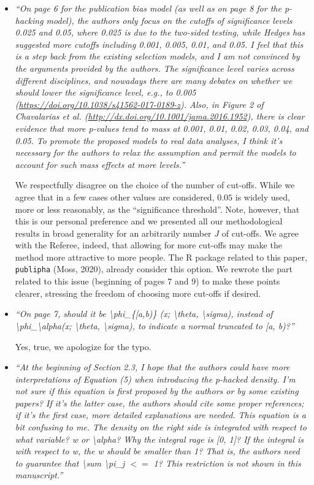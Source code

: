 \documentclass[11pt]{article}
\begin{document}
\begin{itemize}
\item \emph{``On page 6 for the publication bias model (as well as on page 8 for the p-hacking model), the authors only focus on the cutoffs of significance levels 0.025 and 0.05, where 0.025 is due to the two-sided testing, while Hedges has suggested more cutoffs including 0.001, 0.005, 0.01, and 0.05. I feel that this is a step back from the existing selection models, and I am not convinced by the arguments provided by the authors. The significance level varies across different disciplines, and nowadays there are many debates on whether we should lower the significance level, e.g., to 0.005 (\url{https://doi.org/10.1038/s41562-017-0189-z}). Also, in Figure 2 of Chavalarias et al. (\url{http://dx.doi.org/10.1001/jama.2016.1952}), there is clear evidence that more p-values tend to mass at 0.001, 0.01, 0.02, 0.03, 0.04, and 0.05. To promote the proposed models to real data analyses, I think it's necessary for the authors to relax the assumption and permit the models to account for such mass effects at more levels.''}


We respectfully disagree on the choice of the number of cut-offs. While we agree that in a few cases other values are considered, $0.05$ is widely used, more or less reasonably, as the ``significance threshold''. Note, however, that this is our personal preference and we presented all our methodological results in broad generality for an arbitrarily number $J$ of cut-offs. We agree with the Referee, indeed, that allowing for more cut-offs may make the method more attractive to more people. The R package related to this paper, \texttt{publipha} (Moss, 2020), already consider this option. We rewrote the part related to this issue (beginning of pages 7 and 9) to make these points clearer, stressing the freedom of choosing more cut-offs if desired.



\item \emph{``On page 7, should it be \textbackslash phi\_\{[a,b)\} (x; \textbackslash theta, \textbackslash sigma), instead of \textbackslash phi\_\textbackslash alpha(x; \textbackslash theta, \textbackslash sigma), to indicate a normal truncated to [a, b)?''}


Yes, true, we apologize for the typo.



\item \emph{``At the beginning of Section 2.3, I hope that the authors could have more interpretations of Equation (5) when introducing the p-hacked density. I'm not sure if this equation is first proposed by the authors or by some existing papers? If it's the latter case, the authors should cite some proper references; if it's the first case, more detailed explanations are needed. This equation is a bit confusing to me. The density on the right side is integrated with respect to what variable? w or \textbackslash alpha? Why the integral rage is [0, 1]? If the integral is with respect to w, the w should be smaller than 1? That is, the authors need to guarantee that \textbackslash sum \textbackslash pi\_j $<=$ 1? This restriction is not shown in this manuscript.''}


\end{itemize}
\end{document}
